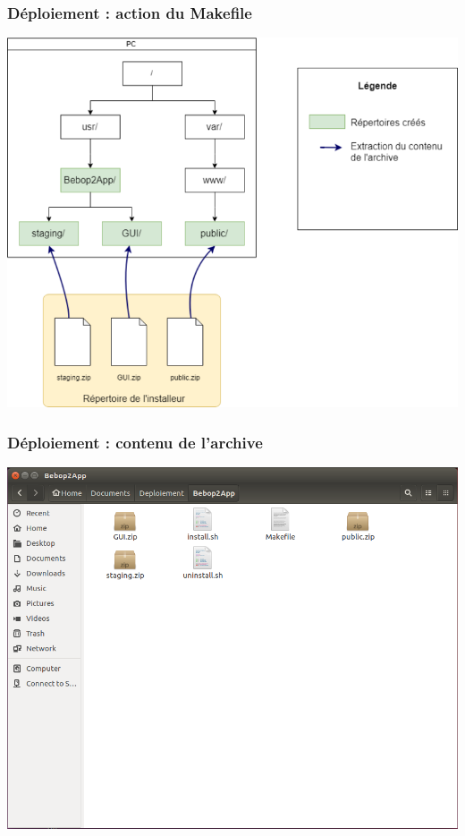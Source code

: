 \documentclass{beamer}
\begin{document}
	
	\begin{frame}
		\begin{center}
		\frametitle{Déploiement : action du Makefile}
        \includegraphics[scale=0.3]{deploiement.png}
		\end{center}
	\end{frame}
	
	
	\begin{frame}
		\begin{center}
		\frametitle{Déploiement : contenu de l'archive}
        \includegraphics[scale=0.3]{result_deploiment_1.png}
		\end{center}
	\end{frame}
	
\end{document}
